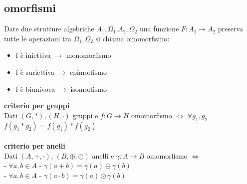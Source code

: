 \documentclass{article}
\begin{document}
\begin{multicols*}{3}
 	 	\subsection{omorfismi}
 	 	Date due strutture algebriche \(A_1, \Omega_1\),\(A_2, \Omega_2\) una funzione \(F: A_1 \rightarrow A_2\) preserva tutte le operazioni tra \(\Omega_1, \Omega_2\) si chiama omomorfismo:
 	 	\begin{itemize}
 	 		\setlength\itemsep{0.1mm}
 	 		\item f è iniettiva \(\rightarrow\) monomorfismo
 	 		\item f è suriettiva \(\rightarrow\) epimorfismo
 	 		\item f è biunivoca \(\rightarrow\) isomorfismo
 	 	\end{itemize}
  		\textbf{criterio per gruppi}\\
  		Dati \((G,*),(H,\cdot)\) gruppi e \(f:G\rightarrow H\) omomorfismo \(\iff\) \(\forall g_1,g_2\)\\
  		\(f(g_1*g_2) = f(g_1) * f(g_2)\)\\\\
  		\textbf{criterio per anelli}\\
  		Dati \((A,+,\cdot)\), \((B,\oplus,\odot)\) anelli e \(\gamma: A \rightarrow B\) omomorfismo \(\iff\)\\
  		- \(\forall a,b \in A\) - \(\gamma(a+b)= \gamma(a)\oplus\gamma(b)\)\\
 	 	- \(\forall a,b \in A\) - \(\gamma(a\cdot b)= \gamma(a)\odot\gamma(b)\)\\ 	
		\end{multicols*}
	
\end{document}
